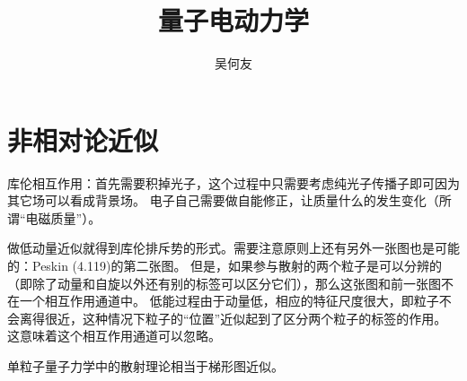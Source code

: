 \documentclass[hyperref, UTF8, a4paper]{ctexart}
\title{量子电动力学}
\author{吴何友}
\begin{document}
\maketitle

\section{非相对论近似}

库伦相互作用：首先需要积掉光子，这个过程中只需要考虑纯光子传播子即可因为其它场可以看成背景场。
电子自己需要做自能修正，让质量什么的发生变化（所谓“电磁质量”）。

做低动量近似就得到库伦排斥势的形式。需要注意原则上还有另外一张图也是可能的：Peskin (4.119)的第二张图。
但是，如果参与散射的两个粒子是可以分辨的（即除了动量和自旋以外还有别的标签可以区分它们），那么这张图和前一张图不在一个相互作用通道中。
低能过程由于动量低，相应的特征尺度很大，即粒子不会离得很近，这种情况下粒子的“位置”近似起到了区分两个粒子的标签的作用。
这意味着这个相互作用通道可以忽略。

单粒子量子力学中的散射理论相当于梯形图近似。
\end{document}
